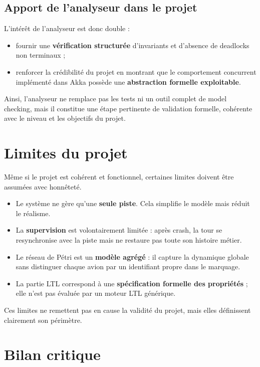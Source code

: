 \documentclass[11pt,a4paper]{article}
\begin{document}
\subsection{Apport de l'analyseur dans le projet}

L'intérêt de l'analyseur est donc double :
\begin{itemize}
    \item fournir une \textbf{vérification structurée} d'invariants et d'absence de deadlocks non terminaux ;
    \item renforcer la crédibilité du projet en montrant que le comportement concurrent implémenté dans Akka possède une \textbf{abstraction formelle exploitable}.
\end{itemize}

Ainsi, l'analyseur ne remplace pas les tests ni un outil complet de model checking, mais il constitue une étape pertinente de validation formelle, cohérente avec le niveau et les objectifs du projet.


\section{Limites du projet}

Même si le projet est cohérent et fonctionnel, certaines limites doivent être assumées avec honnêteté.

\begin{itemize}
    \item Le système ne gère qu'une \textbf{seule piste}. Cela simplifie le modèle mais réduit le réalisme.
    \item La \textbf{supervision} est volontairement limitée : après crash, la tour se resynchronise avec la piste mais ne restaure pas toute son histoire métier.
    \item Le réseau de Pétri est un \textbf{modèle agrégé} : il capture la dynamique globale sans distinguer chaque avion par un identifiant propre dans le marquage.
    \item La partie LTL correspond à une \textbf{spécification formelle des propriétés} ; elle n'est pas évaluée par un moteur LTL générique.
\end{itemize}

Ces limites ne remettent pas en cause la validité du projet, mais elles définissent clairement son périmètre.

\section{Bilan critique}
\end{document}
